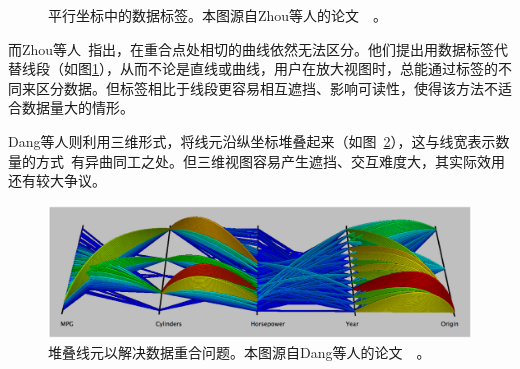 \documentclass[12pt,twocolumn]{article}
\begin{document}
\begin{figure}[!htb]
\centering
{}
\caption{\label{fig:PC_Design_Label}平行坐标中的数据标签。本图源自Zhou等人的论文~\citep{zhou2014parallel}~。}
\end{figure}

而Zhou等人~\citep{zhou2014parallel}指出，在重合点处相切的曲线依然无法区分。他们提出用数据标签代替线段（如图\ref{fig:PC_Design_Label}），从而不论是直线或曲线，用户在放大视图时，总能通过标签的不同来区分数据。但标签相比于线段更容易相互遮挡、影响可读性，使得该方法不适合数据量大的情形。

Dang等人则利用三维形式，将线元沿纵坐标堆叠起来（如图~\ref{fig:PC_Design_Stack}），这与线宽表示数量的方式~\citep{kosara2006parallel}有异曲同工之处。但三维视图容易产生遮挡、交互难度大，其实际效用还有较大争议。

\begin{figure}[!htb]
\centering
\includegraphics[width=0.95\linewidth]{images/PC_Design_Curve5.eps}
\caption{\label{fig:PC_Design_Stack}堆叠线元以解决数据重合问题。本图源自Dang等人的论文~\citep{kosara2006parallel}~。
}
\end{figure}
\end{document}
